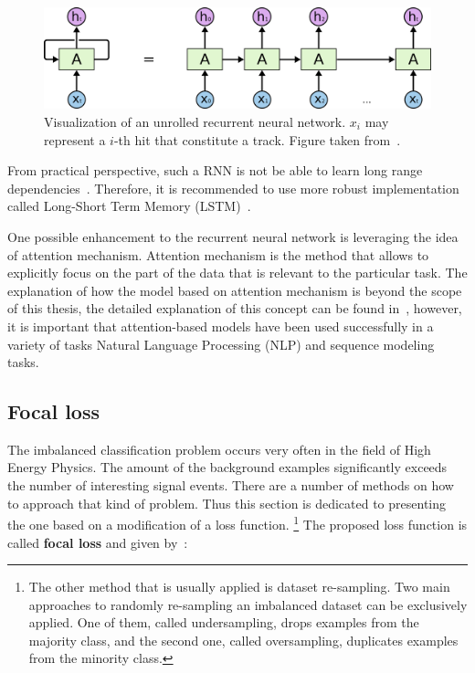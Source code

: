  \begin{figure}[!h]
\centering
\includegraphics{figures/RNN-unrolled.png}
\caption{Visualization of an unrolled recurrent neural network. $x_i$ may represent a $i$-th hit that constitute a track. Figure taken from~\cite{rnn}. 
\label{fig:rnn}}
\end{figure}

From practical perspective, such a RNN is not be able to learn long range dependencies~\cite{bengio_rnn}. Therefore, it is recommended to use more robust implementation called Long-Short Term Memory (LSTM)~\cite{lstm}. 


One possible enhancement to the recurrent neural network is leveraging the idea of attention mechanism. Attention mechanism is the method that allows to explicitly focus on the part of the data that is relevant to the particular task. The explanation of how the model based on attention mechanism is beyond the scope of this thesis, the detailed explanation of this concept can be found in~\cite{attention}, however, it is important that attention-based models have been used successfully in a variety of tasks Natural Language Processing (NLP) and sequence modeling tasks. 

\subsection{Focal loss}
\label{sec:focal_loss}

The imbalanced classification problem occurs very often in the field of High Energy Physics. The amount of the background examples significantly exceeds the number of interesting signal events. There are a number of methods on how to approach that kind of problem. Thus this section is dedicated to presenting the one based on a modification of a loss function. \footnote{The other method that is usually applied is dataset re-sampling. Two main approaches to randomly re-sampling an imbalanced dataset can be exclusively applied. One of them, called undersampling, drops examples from the majority class, and the second one, called oversampling, duplicates examples from the minority class.}  The proposed loss function is called \textbf{focal loss} and given by~\cite{focal_loss}: 

